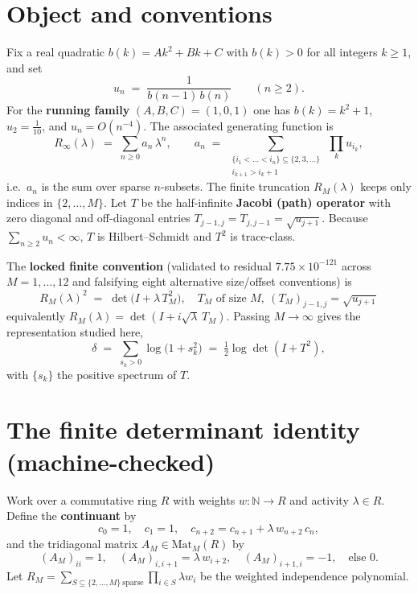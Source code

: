 \documentclass[
]{article}
\theoremstyle{plain}
\theoremstyle{remark}
\begin{document}
\section{Object and conventions}\label{object-and-conventions}

Fix a real quadratic \(b(k)=Ak^2+Bk+C\) with \(b(k)>0\) for all integers
\(k\ge1\), and set \[
u_n \;=\; \frac{1}{b(n-1)\,b(n)}\qquad(n\ge2).
\] For the \textbf{running family} \((A,B,C)=(1,0,1)\) one has
\(b(k)=k^2+1\), \(u_2=\tfrac1{10}\), and \(u_n = O(n^{-4})\). The
associated generating function is \[
R_\infty(\lambda)\;=\;\sum_{n\ge0} a_n\,\lambda^n,\qquad
a_n \;=\;\sum_{\substack{\{i_1<\dots<i_n\}\subseteq\{2,3,\dots\}\\ i_{k+1}>i_k+1}}\ \prod_{k} u_{i_k},
\] i.e.~\(a_n\) is the sum over sparse \(n\)-subsets. The finite
truncation \(R_M(\lambda)\) keeps only indices in \(\{2,\dots,M\}\). Let
\(T\) be the half-infinite \textbf{Jacobi (path) operator} with zero
diagonal and off-diagonal entries
\(T_{j-1,j}=T_{j,j-1}=\sqrt{u_{j+1}}\). Because
\(\sum_{n\ge2}u_n<\infty\), \(T\) is Hilbert--Schmidt and \(T^2\) is
trace-class.

The \textbf{locked finite convention} (validated to residual
\(7.75\times10^{-121}\) across \(M=1,\dots,12\) and falsifying eight
alternative size/offset conventions) is \[
\boxed{\;R_M(\lambda)^2 \;=\; \det\!\bigl(I+\lambda\,T_M^2\bigr),\quad
T_M \text{ of size } M,\ (T_M)_{j-1,j}=\sqrt{u_{j+1}}\;}
\] equivalently \(R_M(\lambda)=\det(I+i\sqrt{\lambda}\,T_M)\). Passing
\(M\to\infty\) gives the representation studied here, \[
\delta \;=\; \sum_{s_k>0}\log\!\bigl(1+s_k^2\bigr)\;=\;\tfrac12\log\det(I+T^2),
\] with \(\{s_k\}\) the positive spectrum of \(T\).

\section{The finite determinant identity
(machine-checked)}\label{the-finite-determinant-identity-machine-checked}

Work over a commutative ring \(R\) with weights \(w:\mathbb N\to R\) and
activity \(\lambda\in R\). Define the \textbf{continuant} by \[
c_0=1,\quad c_1=1,\quad c_{n+2}=c_{n+1}+\lambda\,w_{n+2}\,c_n, \tag{REC}
\] and the tridiagonal matrix \(A_M\in\mathrm{Mat}_{M}(R)\) by \[
(A_M)_{ii}=1,\quad (A_M)_{i,i+1}=\lambda\,w_{i+2},\quad (A_M)_{i+1,i}=-1,\quad
\text{else }0.
\] Let
\(R_M=\sum_{S\subseteq\{2,\dots,M\}\ \mathrm{sparse}}\prod_{i\in S}\lambda w_i\)
be the weighted independence polynomial.
\end{document}
